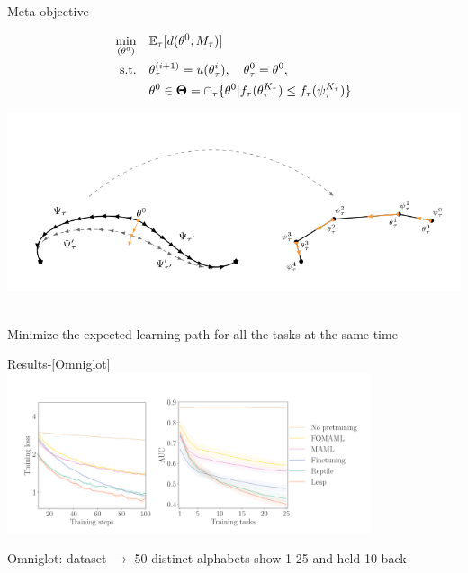 \documentclass[aspectratio=169]{beamer}
\begin{document}
\begin{frame}{Meta objective}
	\begin{minipage}{0.5\textwidth}
	\begin{align*}
	\centering
	\min_{(\theta^0)} \quad & \mathbb{E}_{\tau}[d(\theta^0;M_\tau)] \\
		\text{s.t.} \quad  & \theta_\tau^{(i+1)}=u(\theta_\tau^i), \quad \theta_\tau^0=\theta^0, \\
		& \theta^0 \in \boldsymbol{\Theta}=\cap_\tau\{\theta^0 | f_\tau(\theta_\tau^{K_\tau}) \leq f_\tau(\psi_\tau^{K_\tau})\}
	\end{align*}
	\end{minipage}%
	\begin{minipage}{0.5\textwidth}
		\includegraphics[width=\textwidth]{Figures/path}
	\end{minipage}
	\\
	\vspace{1cm}
		\centering
		\color{Pink} Minimize the expected learning path for all the tasks at the same time
\end{frame}

\begin{frame}{Results-[Omniglot]}
	\centering
	\includegraphics[width=0.8\textwidth]{Figures/omni}
	
	\color{Pink} Omniglot: dataset $\to$ 50 distinct alphabets show 1-25 and held 10 back
\end{frame}
\end{document}
